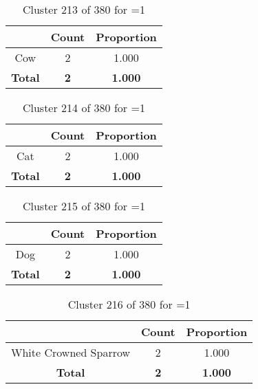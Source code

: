 \begin{table}[ht!]
\centering
\begin{tabular}{|c|c|c|}
\hline
\bf \Spec{} &\bf Count &\bf Proportion\\ \hline \hline
Cow & 2 & 1.000\\ \hline
\hline
\bf Total & \bf 2 & \bf 1.000\\ \hline
\end{tabular}
\label{tab:cluster:213:1}
\caption{Cluster 213 of 380 for \minneigh{}=1}
\end{table}

\begin{table}[ht!]
\centering
\begin{tabular}{|c|c|c|}
\hline
\bf \Spec{} &\bf Count &\bf Proportion\\ \hline \hline
Cat & 2 & 1.000\\ \hline
\hline
\bf Total & \bf 2 & \bf 1.000\\ \hline
\end{tabular}
\label{tab:cluster:214:1}
\caption{Cluster 214 of 380 for \minneigh{}=1}
\end{table}

\begin{table}[ht!]
\centering
\begin{tabular}{|c|c|c|}
\hline
\bf \Spec{} &\bf Count &\bf Proportion\\ \hline \hline
Dog & 2 & 1.000\\ \hline
\hline
\bf Total & \bf 2 & \bf 1.000\\ \hline
\end{tabular}
\label{tab:cluster:215:1}
\caption{Cluster 215 of 380 for \minneigh{}=1}
\end{table}

\begin{table}[ht!]
\centering
\begin{tabular}{|c|c|c|}
\hline
\bf \Spec{} &\bf Count &\bf Proportion\\ \hline \hline
White Crowned Sparrow & 2 & 1.000\\ \hline
\hline
\bf Total & \bf 2 & \bf 1.000\\ \hline
\end{tabular}
\label{tab:cluster:216:1}
\caption{Cluster 216 of 380 for \minneigh{}=1}
\end{table}


